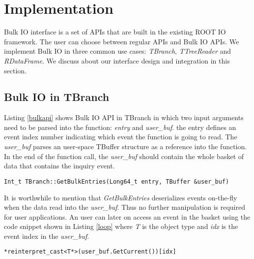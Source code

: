 \section{Implementation}
\label{sec:implementation}

Bulk IO interface is a set of APIs that are built in the existing ROOT IO framework. The user can choose between regular APIs and Bulk IO APIs. We implement Bulk IO in three common use cases: \textit{TBranch}, \textit{TTreeReader} and \textit{RDataFrame}. We discuss about our interface design and integration in this section.

\subsection{Bulk IO in TBranch}

Listing \ref{bulkapi} shows Bulk IO API in TBranch in which two input arguments need to be parsed into the function: \textit{entry} and \textit{user\_buf}. the entry defines an event index number indicating which event the function is going to read. The \textit{user\_buf} parses an user-space TBuffer structure as a reference into the function. In the end of the function call, the \textit{user\_buf} should contain the whole basket of data that contains the inquiry event.

\lstset{
  basicstyle=\footnotesize\ttfamily, frame=single,
  xleftmargin=.05\textwidth, xrightmargin=.05\textwidth
}
\begin{lstlisting}[label={bulkapi}]
Int_t TBranch::GetBulkEntries(Long64_t entry, TBuffer &user_buf)
\end{lstlisting}
\vspace{-10pt}


It is worthwhile to mention that \textit{GetBulkEntries} deserializes events on-the-fly when the data read into the \textit{user\_buf}. Thus no further manipulation is required for user applications. An user can later on access an event in the basket using the code snippet shown in Listing \ref{loop} where \textit{T} is the object type and \textit{idx} is the event index in the \textit{user\_buf}.

\lstset{
  basicstyle=\ttfamily, frame=single,
  xleftmargin=.08\textwidth, xrightmargin=.08\textwidth
}
\begin{lstlisting}[label={loop}]
 *reinterpret_cast<T*>(user_buf.GetCurrent())[idx]
\end{lstlisting}
\vspace{-10pt}


